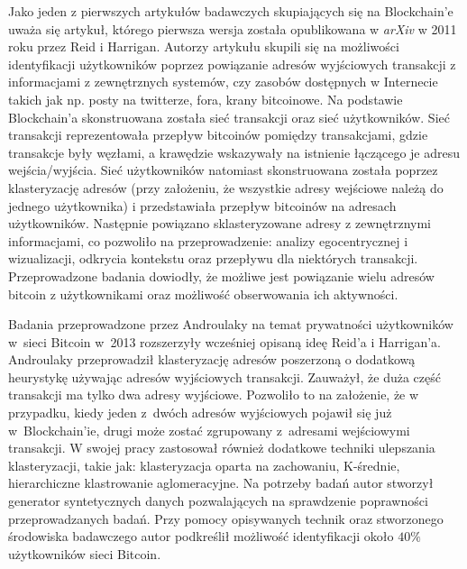 \documentclass[12pt, twoside, final, openany]{mgr}
\begin{document}
\indent Jako jeden z pierwszych artykułów badawczych skupiających się na Blockchain'e uważa się artykuł, którego pierwsza wersja została opublikowana w \textit{arXiv} w 2011 roku przez Reid i Harrigan\cite{Reid2013}. Autorzy artykułu skupili się na możliwości identyfikacji użytkowników poprzez powiązanie adresów wyjściowych transakcji z informacjami z zewnętrznych systemów, czy zasobów dostępnych w Internecie takich jak np. posty na twitterze, fora, krany bitcoinowe. Na podstawie Blockchain'a skonstruowana została sieć transakcji oraz sieć użytkowników. Sieć transakcji reprezentowała przepływ bitcoinów pomiędzy transakcjami, gdzie transakcje były węzłami, a krawędzie wskazywały na istnienie łączącego je adresu wejścia/wyjścia. Sieć użytkowników natomiast skonstruowana została poprzez klasteryzację adresów (przy założeniu, że wszystkie adresy wejściowe należą do jednego użytkownika) i przedstawiała przepływ bitcoinów na adresach użytkowników. Następnie powiązano sklasteryzowane adresy z zewnętrznymi informacjami, co pozwoliło na przeprowadzenie: analizy egocentrycznej i wizualizacji, odkrycia kontekstu oraz przepływu dla niektórych transakcji. Przeprowadzone badania dowiodły, że możliwe jest powiązanie wielu adresów bitcoin z  użytkownikami oraz możliwość obserwowania ich aktywności.

\indent Badania przeprowadzone przez Androulaky\cite{Androulaki2013} na temat prywatności użytkowników w~sieci Bitcoin w~2013 rozszerzyły wcześniej opisaną ideę Reid'a i Harrigan'a\cite{Reid2013}. Androulaky przeprowadził klasteryzację adresów poszerzoną o dodatkową heurystykę używając adresów wyjściowych transakcji. Zauważył, że duża część transakcji ma tylko dwa adresy wyjściowe. Pozwoliło to na założenie, że w przypadku, kiedy jeden z~dwóch adresów wyjściowych pojawił się już w~Blockchain'ie, drugi może zostać zgrupowany z~adresami wejściowymi transakcji. W swojej pracy zastosował również dodatkowe techniki ulepszania klasteryzacji, takie jak: klasteryzacja oparta na zachowaniu, K-średnie, hierarchiczne klastrowanie aglomeracyjne. Na potrzeby badań autor stworzył generator syntetycznych danych pozwalających na sprawdzenie poprawności przeprowadzanych badań. Przy pomocy opisywanych technik oraz stworzonego środowiska badawczego autor podkreślił możliwość identyfikacji około $40\%$ użytkowników sieci Bitcoin. 
\end{document}
